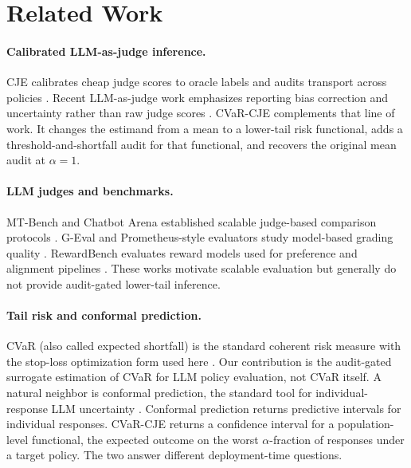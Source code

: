 \section{Related Work}
\label{sec:related}

\paragraph{Calibrated LLM-as-judge inference.}
CJE calibrates cheap judge scores to oracle labels and audits transport
across policies \citep{LandesbergNarayan2026CJE}. Recent LLM-as-judge
work emphasizes reporting bias correction and uncertainty rather than
raw judge scores \citep{Lee2025LLMJudgeReporting,Chen2026EfficientLLMJudge,
Li2025CalibraEval}. CVaR-CJE complements that line of work. It changes
the estimand from a mean to a lower-tail risk functional, adds a
threshold-and-shortfall audit for that functional, and recovers the
original mean audit at $\alpha = 1$.

\paragraph{LLM judges and benchmarks.}
MT-Bench and Chatbot Arena established scalable judge-based comparison
protocols \citep{Zheng2023Judging,Chiang2024ChatbotArena}. G-Eval and
Prometheus-style evaluators study model-based grading quality
\citep{Liu2023GEval,Kim2024Prometheus2}. RewardBench evaluates reward
models used for preference and alignment pipelines
\citep{Lambert2024RewardBench}. These works motivate scalable
evaluation but generally do not provide audit-gated lower-tail
inference.

\paragraph{Tail risk and conformal prediction.}
CVaR (also called expected shortfall) is the standard coherent risk
measure with the stop-loss optimization form used here
\citep{RockafellarUryasev2000,RockafellarUryasev2002,AcerbiTasche2002}.
Our contribution is the audit-gated surrogate estimation of CVaR for
LLM policy evaluation, not CVaR itself. A natural neighbor is conformal
prediction, the standard tool for individual-response LLM uncertainty
\citep{Angelopoulos2021Gentle}. Conformal prediction returns predictive
intervals for individual responses. CVaR-CJE returns a confidence
interval for a population-level functional, the expected outcome on
the worst $\alpha$-fraction of responses under a target policy. The
two answer different deployment-time questions.

